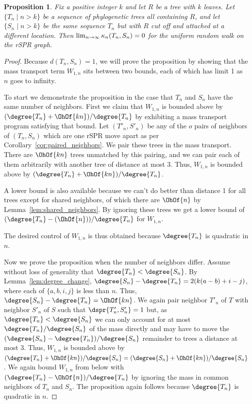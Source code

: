 \documentclass[11pt,onecolumn,conference]{IEEEtran}
\newtheorem{proposition}[theorem]{Proposition}
\newcommand{\curvature}[2][]{%
    \ifthenelse{\equal{#1}{}}%
		{\kappa_n(#2)}%
		{\kappa_n(#1;#2)}%
}
\begin{document}
\begin{proposition}
Fix a positive integer $k$ and let $R$ be a tree with $k$ leaves.
Let $\{T_n \mid n > k\}$ be a sequence of phylogenetic trees all containing $R$, and let $\{S_n \mid n > k\}$ be the same sequence $T_n$ but with $R$ cut off and attached at a different location.
Then $\lim_{n \rightarrow \infty} \curvature{T_n,S_n} = 0$ for the uniform random walk on the rSPR graph.
\end{proposition}
\begin{proof}
Because $d(T_n, S_n) = 1$, we will prove the proposition by showing that the mass transport term $W_{1,n}$ sits between two bounds, each of which has limit 1 as $n$ goes to infinity.

To start we demonstrate the proposition in the case that $T_n$ and $S_n$ have the same number of neighbors.
First we claim that $W_{1,n}$ is bounded above by $(\degree{T_n}+\OhOf{kn})/\degree{T_n}$ by exhibiting a mass transport program satisfying that bound.
Let $(T'_n, S'_n)$ be any of the $o$ pairs of neighbors of $(T_n, S_n)$ which are one rSPR move apart as per Corollary~\ref{cor:paired_neighbors}.
We pair these trees in the mass transport.
There are $\OhOf{kn}$ trees unmatched by this pairing, and we can pair each of them arbitrarily with another tree of distance at most 3.
Thus, $W_{1,n}$ is bounded above by $(\degree{T_n} + \OhOf{kn}) / \degree{T_n}$.

A lower bound is also available because we can't do better than distance 1 for all trees except for shared neighbors, of which there are $\OhOf{n}$ by Lemma~\ref{lem:shared_neighbors}.
By ignoring these trees we get a lower bound of $(\degree{T_n} - (\OhOf{n}))/\degree{T_n}$ for $W_{1,n}$.

The desired control of $W_{1,n}$ is thus obtained because $\degree{T_n}$ is quadratic in $n$.

Now we prove the proposition when the number of neighbors differ.
Assume without loss of generality that $\degree{T_n} < \degree{S_n}$.
By Lemma~\ref{lem:degree_change}, $\degree{S_n} - \degree{T_n} = 2(k(a-b) + i - j)$, where each of $\{a,b,i,j\}$ is less than $n$.
Thus, $\degree{S_n} - \degree{T_n} = \OhOf{kn}$.
We again pair neighbor $T'_n$ of $T$ with neighbor $S'_n$ of $S$ such that $\dspr{T'_n, S'_n}=1$ but, as $\degree{T_n} < \degree{S_n}$ we can only account for at most $\degree{T_n} / \degree{S_n}$ of the mass directly and may have to move the $(\degree{S_n} - \degree{T_n}) / \degree{S_n}$ remainder to trees a distance at most 3.
Thus, $W_{1,n}$ is bounded above by $(\degree{T_n} + \OhOf{kn}) / \degree{S_n} = (\degree{S_n} + \OhOf{kn}) / \degree{S_n}$.
We again bound $W_{1,n}$ from below with $(\degree{T_n} - \OhOf{n}) / \degree{T_n}$ by ignoring the mass in common neighbors of $T_n$ and $S_n$.
The proposition again follows because $\degree{T_n}$ is quadratic in $n$.

\end{proof}
\end{document}
